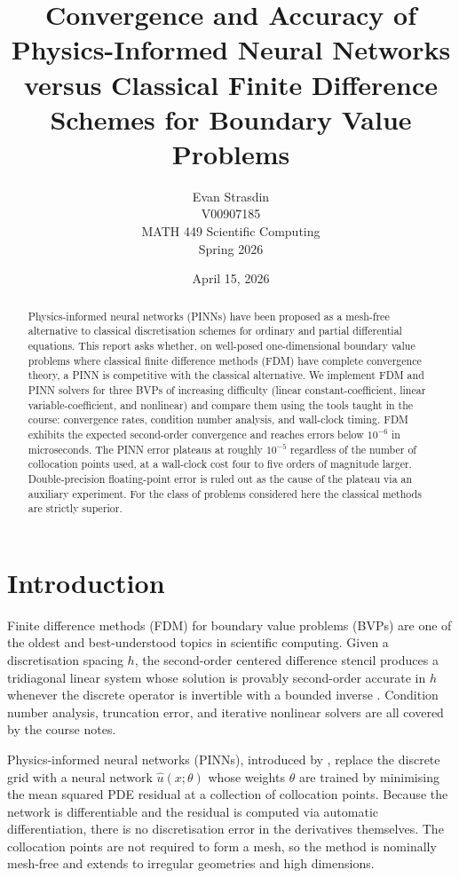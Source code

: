 \documentclass[11pt]{article}
\title{Convergence and Accuracy of Physics-Informed Neural Networks versus
       Classical Finite Difference Schemes for Boundary Value Problems}
\author{
Evan Strasdin\\
V00907185\\
MATH 449 Scientific Computing\\
Spring 2026
}
\date{April 15, 2026}
\theoremstyle{plain}
\theoremstyle{remark}
\begin{document}
\maketitle

\begin{abstract}
Physics-informed neural networks (PINNs) have been proposed as a mesh-free
alternative to classical discretisation schemes for ordinary and partial
differential equations. This report asks whether, on well-posed one-dimensional
boundary value problems where classical finite difference methods (FDM) have
complete convergence theory, a PINN is competitive with the classical
alternative. We implement FDM and PINN solvers for three BVPs of increasing
difficulty (linear constant-coefficient, linear variable-coefficient, and
nonlinear) and compare them using the tools taught in the course: convergence
rates, condition number analysis, and wall-clock timing. FDM exhibits the
expected second-order convergence and reaches errors below $10^{-6}$ in
microseconds. The PINN error plateaus at roughly $10^{-5}$ regardless of
the number of collocation points used, at a wall-clock cost four to five
orders of magnitude larger. Double-precision floating-point error is ruled
out as the cause of the plateau via an auxiliary experiment. For the class
of problems considered here the classical methods are strictly superior.
\end{abstract}

\tableofcontents


\section{Introduction}
\label{sec:intro}

Finite difference methods (FDM) for boundary value problems (BVPs) are one of
the oldest and best-understood topics in scientific computing. Given a
discretisation spacing $h$, the second-order centered difference stencil
produces a tridiagonal linear system whose solution is provably second-order
accurate in $h$ whenever the discrete operator is invertible with a bounded
inverse \citep{leveque2007,golub1992}. Condition number analysis, truncation
error, and iterative nonlinear solvers are all covered by the course notes.

Physics-informed neural networks (PINNs), introduced by
\citet{raissi2019}, replace the discrete grid with a neural network
$\hat{u}(x;\theta)$ whose weights $\theta$ are trained by minimising the mean
squared PDE residual at a collection of collocation points. Because the
network is differentiable and the residual is computed via automatic
differentiation, there is no discretisation error in the derivatives
themselves. The collocation points are not required to form a mesh, so
the method is nominally mesh-free and extends to irregular geometries and
high dimensions.
\end{document}
